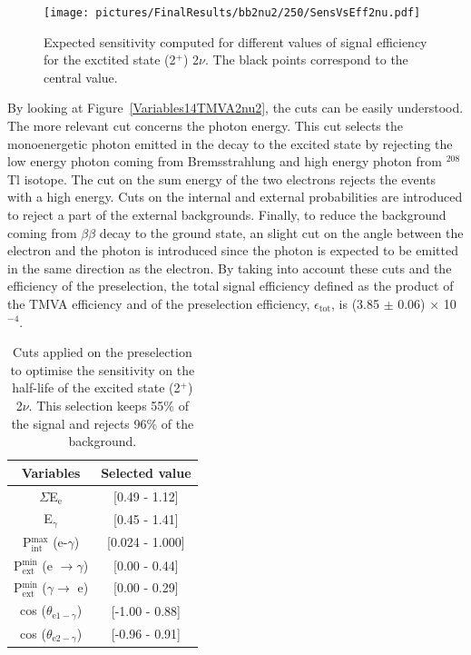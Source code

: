 \documentclass[main.tex]{subfiles}
\begin{document}
\begin{figure} [h!]
\begin{center}
\texttt{[image: pictures/FinalResults/bb2nu2/250/SensVsEff2nu.pdf]}
\end{center}
\caption{Expected sensitivity computed for different values of signal efficiency for the exctited state (2$^+$) 2$\nu$. The black points correspond to the central value.}
\label{plot:SensVsEff_250}
\end{figure}


\bigskip


\NI By looking at Figure~\ref{Variables14TMVA2nu2}, the cuts can be easily understood. The more relevant cut concerns the photon energy. This cut selects the monoenergetic photon emitted in the decay to the excited state by rejecting the low energy photon coming from Bremsstrahlung and high energy photon from $^{\text{208}}$Tl isotope. The cut on the sum energy of the two electrons rejects the events with a high energy. Cuts on the internal and external probabilities are introduced to reject a part of the external backgrounds. Finally, to reduce the background coming from $\beta\beta$ decay to the ground state, an slight cut on the angle between the electron and the photon is introduced since the photon is expected to be emitted in the same direction as the electron. By taking into account these cuts and the efficiency of the preselection, the total signal efficiency defined as the product of the TMVA efficiency and of the preselection efficiency, $\epsilon_{\text{tot}}$, is (3.85 $\pm$ 0.06) $\times$ 10$^{-\text{4}}$. 


\FloatBarrier


\begin{table}[h!]
\centering
\begin{tabular}{c|c}
Variables & Selected value \\
\toprule
$\Sigma$E$_{\text{e}}$ & [0.49 - 1.12] \\
E$_{\gamma}$    & [0.45 - 1.41] \\
P$_{\text{int}}^{\text{max}}$ (e-$\gamma$) & [0.024 - 1.000] \\
P$_{\text{ext}}^{\text{min}}$ (e $\rightarrow \gamma$) & [0.00 - 0.44] \\
P$_{\text{ext}}^{\text{min}}$ ($\gamma \rightarrow$ e) & [0.00 - 0.29] \\
cos ($\theta_{\text{e1}-\gamma}$) & [-1.00 - 0.88] \\
cos ($\theta_{\text{e2}-\gamma}$) & [-0.96 - 0.91] \\
\bottomrule
\end{tabular}
\caption{Cuts applied on the preselection to optimise the sensitivity on the half-life of the excited state (2$^+$) 2$\nu$. This selection keeps 55\% of the signal and rejects 96\% of the background.}
\label{tab:Cuts2nu2Plus250keV}
\end{table}
\end{document}
